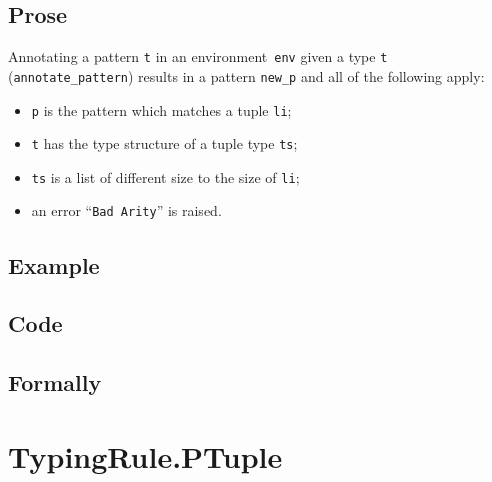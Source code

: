 \documentclass{book}
\begin{document}
  \subsection{Prose}
   Annotating a pattern \texttt{t} in an environment~\texttt{env} given a type \texttt{t} (\texttt{annotate\_pattern}) results in a pattern \texttt{new\_p} and all of the following apply:
   \begin{itemize}
   \item \texttt{p} is the pattern which matches a tuple \texttt{li};
   \item \texttt{t} has the type structure of a tuple type \texttt{ts};
   \item \texttt{ts} is a list of different size to the size of \texttt{li};
   \item an error ``\texttt{Bad Arity}'' is raised.
   \end{itemize}

  \subsection{Example}

  \subsection{Code}

\begin{emptyformal}
    \subsection{Formally}
\end{emptyformal}



\section{TypingRule.PTuple \label{sec:TypingRule.PTuple}}
\end{document}
